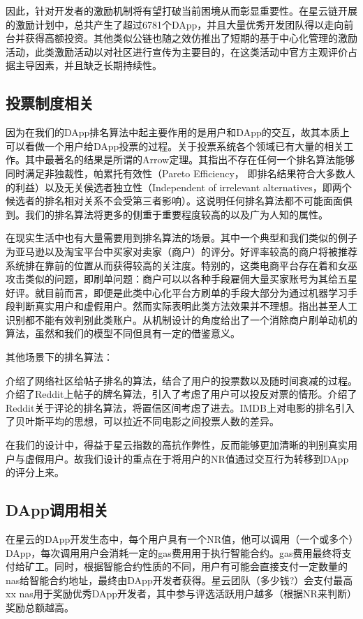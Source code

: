 因此，针对开发者的激励机制将有望打破当前困境从而彰显重要性。在星云链开展的激励计划中，总共产生了超过6781个DApp，并且大量优秀开发团队得以走向前台并获得高额投资\cite{Nabulasincentive}。其他类似公链也随之效仿推出了短期的基于中心化管理的激励活动，此类激励活动以对社区进行宣传为主要目的，在这类活动中官方主观评价占据主导因素，并且缺乏长期持续性。

\subsection{投票制度相关}
因为在我们的DApp排名算法中起主要作用的是用户和DApp的交互，故其本质上可以看做一个用户给DApp投票的过程。关于投票系统各个领域已有大量的相关工作。其中最著名的结果是所谓的Arrow定理\cite{arrow1951extension}。其指出不存在任何一个排名算法能够同时满足非独裁性，帕累托有效性（Pareto Efficiency， 即排名结果符合大多数人的利益）以及无关侯选者独立性（Independent of irrelevant alternatives，即两个候选者的排名相对关系不会受第三者影响）。这说明任何排名算法都不可能面面俱到。我们的排名算法将更多的侧重于重要程度较高的以及广为人知的属性。

在现实生活中也有大量需要用到排名算法的场景。其中一个典型和我们类似的例子为亚马逊以及淘宝平台中买家对卖家（商户）的评分。好评率较高的商户将被推荐系统排在靠前的位置从而获得较高的关注度。特别的，这类电商平台存在着和女巫攻击类似的问题，即刷单问题：商户可以以各种手段雇佣大量买家账号为其给五星好评。就目前而言，即便是此类中心化平台方刷单的手段大部分为通过机器学习手段判断真实用户和虚假用户\cite{mukherjee2013spotting,jindal2008opinion,yoo2009comparison}。然而实际表明此类方法效果并不理想。\cite{ott2011finding}指出甚至人工识别都不能有效判别此类账户。\cite{cai2016mechanism}从机制设计的角度给出了一个消除商户刷单动机的算法，虽然和我们的模型不同但具有一定的借鉴意义。

其他场景下的排名算法：

\cite{salihefendic2010hacker}介绍了网络社区给帖子排名的算法，结合了用户的投票数以及随时间衰减的过程。\cite{salihefendic2010reddit}介绍了Reddit上帖子的牌名算法，引入了考虑了用户可以投反对票的情形。\cite{miller2009how}介绍了Reddit关于评论的排名算法，将置信区间考虑了进去。IMDB\cite{IMDB}上对电影的排名引入了贝叶斯平均的思想，可以拉近不同电影之间投票人数的差异。

在我们的设计中，得益于星云指数\cite{Nabulasyellowpaper}的高抗作弊性，反而能够更加清晰的判别真实用户与虚假用户。故我们设计的重点在于将用户的NR值通过交互行为转移到DApp的评分上来。



\subsection{DApp调用相关}
\label{subsec:2.3}
在星云的DApp开发生态中，每个用户具有一个NR值，他可以调用（一个或多个）DApp，每次调用用户会消耗一定的gas费用用于执行智能合约。gas费用最终将支付给矿工。同时，根据智能合约性质的不同，用户有可能会直接支付一定数量的nas给智能合约地址，最终由DApp开发者获得。星云团队（{\color{red}多少钱?}）会支付最高xx nas用于奖励优秀DApp开发者，其中参与评选活跃用户越多（根据NR来判断）奖励总额越高。

